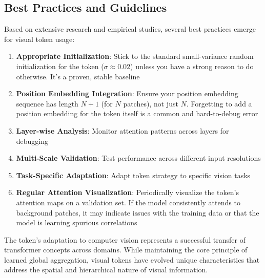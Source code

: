 \subsection{Best Practices and Guidelines}

Based on extensive research and empirical studies, several best practices emerge for visual \cls{} token usage:

\begin{enumerate}
\item \textbf{Appropriate Initialization}: Stick to the standard small-variance random initialization for the \cls{} token ($\sigma \approx 0.02$) unless you have a strong reason to do otherwise. It's a proven, stable baseline
\item \textbf{Position Embedding Integration}: Ensure your position embedding sequence has length $N+1$ (for $N$ patches), not just $N$. Forgetting to add a position embedding for the \cls{} token itself is a common and hard-to-debug error
\item \textbf{Layer-wise Analysis}: Monitor attention patterns across layers for debugging
\item \textbf{Multi-Scale Validation}: Test performance across different input resolutions
\item \textbf{Task-Specific Adaptation}: Adapt \cls{} token strategy to specific vision tasks
\item \textbf{Regular Attention Visualization}: Periodically visualize the \cls{} token's attention maps on a validation set. If the model consistently attends to background patches, it may indicate issues with the training data or that the model is learning spurious correlations
\end{enumerate}

The \cls{} token's adaptation to computer vision represents a successful transfer of transformer concepts across domains. While maintaining the core principle of learned global aggregation, visual \cls{} tokens have evolved unique characteristics that address the spatial and hierarchical nature of visual information.